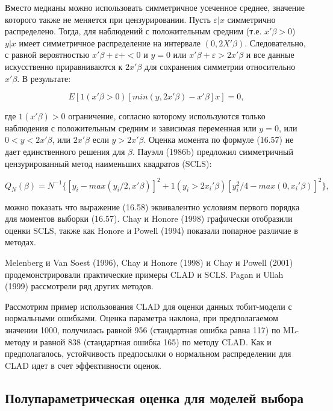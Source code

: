 Вместо медианы можно использовать симметричное усеченное среднее, значение которого также не меняется при цензурировании. Пусть $\varepsilon|x$ симметрично распределено. Тогда, для наблюдений с положительным средним (т.е. $x'\beta>0$) $y|x$ имеет симметричное распределение на интервале $(0,2X'\beta)$. Следовательно, с равной вероятностью $x'\beta+\varepsilon+<0$ и $y=0$ или $x'\beta+\varepsilon>2x'\beta$ и все данные искусственно приравниваются к $2x'\beta$ для сохранения симметрии относительно $x'\beta$. В результате:

\begin{equation}
E[1(x'\beta>0)[min(y,2x'\beta)-x'\beta]x]=0,
\end{equation}

где $1(x'\beta)>0$ ограничение, согласно которому используются только наблюдения с положительным средним и зависимая переменная или $y=0$, или $0<y<2x'\beta$, или $2x'\beta$ если $y>2x'\beta$. Оценка момента по формуле (16.57) не дает единственного решения для $\beta$. Пауэлл (1986b) предложил симметричный цензурированный метод наименьших квадратов (SCLS):

\begin{equation}
Q_N(\beta)=N^{-1}\lbrace[y_i-max(y_i/2,x'\beta)]^{2}+1(y_i>2x_i'\beta)[y_i^2/4-max(0,x_i'\beta)]^2\rbrace,
\end{equation}

можно показать что выражение (16.58) эквивалентно условиям первого порядка для моментов выборки (16.57). Chay и Honore (1998) графически отобразили оценки SCLS, также как Honore и Powell (1994) показали попарное различие в методах. 

Melenberg и Van Soest (1996), Chay и Honore (1998) и Chay и Powell (2001) продемонстрировали практические примеры CLAD и SCLS. Pagan и Ullah (1999) рассмотрели ряд других методов.

Рассмотрим пример использования CLAD для оценки данных тобит-модели с нормальными ошибками. Оценка параметра наклона, при предполагаемом значении 1000, получилась равной 956 (стандартная ошибка равна 117) по ML-методу и равной 838 (стандартная ошибка 165) по методу CLAD. Как и предполагалось, устойчивость предпосылки о нормальном распределении для CLAD идет в счет эффективности оценок.

\subsection{Полупараметрическая оценка для моделей выбора}

